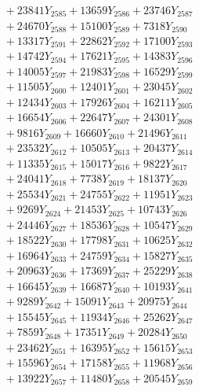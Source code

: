 \documentclass[a4paper,10pt]{article}
\begin{document}
{\begin{align}
&\;  + 23841 Y_{2585} + 13659 Y_{2586} + 23746 Y_{2587} \\[0.3ex]
&\;  + 24670 Y_{2588} + 15100 Y_{2589} + 7318 Y_{2590} \\[0.3ex]
&\;  + 13317 Y_{2591} + 22862 Y_{2592} + 17100 Y_{2593} \\[0.3ex]
&\;  + 14742 Y_{2594} + 17621 Y_{2595} + 14383 Y_{2596} \\[0.3ex]
&\;  + 14005 Y_{2597} + 21983 Y_{2598} + 16529 Y_{2599} \\[0.3ex]
&\;  + 11505 Y_{2600} + 12401 Y_{2601} + 23045 Y_{2602} \\[0.3ex]
&\;  + 12434 Y_{2603} + 17926 Y_{2604} + 16211 Y_{2605} \\[0.3ex]
&\;  + 16654 Y_{2606} + 22647 Y_{2607} + 24301 Y_{2608} \\[0.5ex]\allowbreak
&\;  + 9816 Y_{2609} + 16660 Y_{2610} + 21496 Y_{2611} \\[0.3ex]
&\;  + 23532 Y_{2612} + 10505 Y_{2613} + 20437 Y_{2614} \\[0.3ex]
&\;  + 11335 Y_{2615} + 15017 Y_{2616} + 9822 Y_{2617} \\[0.3ex]
&\;  + 24041 Y_{2618} + 7738 Y_{2619} + 18137 Y_{2620} \\[0.3ex]
&\;  + 25534 Y_{2621} + 24755 Y_{2622} + 11951 Y_{2623} \\[0.3ex]
&\;  + 9269 Y_{2624} + 21453 Y_{2625} + 10743 Y_{2626} \\[0.3ex]
&\;  + 24446 Y_{2627} + 18536 Y_{2628} + 10547 Y_{2629} \\[0.3ex]
&\;  + 18522 Y_{2630} + 17798 Y_{2631} + 10625 Y_{2632} \\[0.3ex]
&\;  + 16964 Y_{2633} + 24759 Y_{2634} + 15827 Y_{2635} \\[0.3ex]
&\;  + 20963 Y_{2636} + 17369 Y_{2637} + 25229 Y_{2638} \\[0.5ex]\allowbreak
&\;  + 16645 Y_{2639} + 16687 Y_{2640} + 10193 Y_{2641} \\[0.3ex]
&\;  + 9289 Y_{2642} + 15091 Y_{2643} + 20975 Y_{2644} \\[0.3ex]
&\;  + 15545 Y_{2645} + 11934 Y_{2646} + 25262 Y_{2647} \\[0.3ex]
&\;  + 7859 Y_{2648} + 17351 Y_{2649} + 20284 Y_{2650} \\[0.3ex]
&\;  + 23462 Y_{2651} + 16395 Y_{2652} + 15615 Y_{2653} \\[0.3ex]
&\;  + 15596 Y_{2654} + 17158 Y_{2655} + 11968 Y_{2656} \\[0.3ex]
&\;  + 13922 Y_{2657} + 11480 Y_{2658} + 20545 Y_{2659} \\[0.3ex]

\end{align}}
\end{document}
